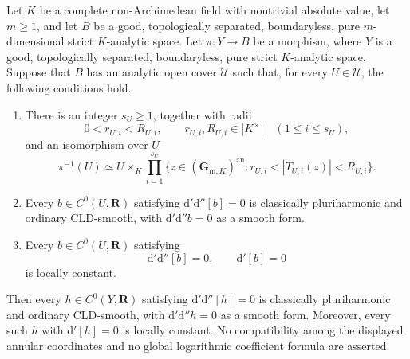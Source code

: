 \begin{proposition}
\label{prop:p062-stage-local-polyannulus-smooth-rigidity-transfer}
Let $K$ be a complete non-Archimedean field with nontrivial absolute value,
let $m\geq1$, and let $B$ be a good, topologically separated,
boundaryless, pure $m$-dimensional strict $K$-analytic space.  Let
$\pi:Y\to B$ be a morphism, where $Y$ is a good, topologically separated,
boundaryless, pure strict $K$-analytic space.  Suppose that $B$ has an
analytic open cover $\mathcal U$ such that, for every $U\in\mathcal U$,
the following conditions hold.
\begin{enumerate}
\item There is an integer $s_U\geq1$, together with radii
\[
 0<r_{U,i}<R_{U,i},\qquad r_{U,i},R_{U,i}\in|K^\times|
 \quad(1\leq i\leq s_U),
\]
and an isomorphism over $U$
\[
 \pi^{-1}(U)\simeq
 U\times_K\prod_{i=1}^{s_U}
 \{z\in(\mathbf G_{\mathrm m,K})^{\mathrm{an}}:
                  r_{U,i}<|T_{U,i}(z)|<R_{U,i}\}.
\]
\item Every $b\in C^0(U,\mathbf R)$ satisfying
$\mathrm d'\mathrm d''[b]=0$ is classically pluriharmonic and ordinary
CLD-smooth, with $\mathrm d'\mathrm d''b=0$ as a smooth form.
\item Every $b\in C^0(U,\mathbf R)$ satisfying
\[
             \mathrm d'\mathrm d''[b]=0,
             \qquad \mathrm d'[b]=0
\]
is locally constant.
\end{enumerate}
Then every $h\in C^0(Y,\mathbf R)$ satisfying
$\mathrm d'\mathrm d''[h]=0$ is classically pluriharmonic and ordinary
CLD-smooth, with $\mathrm d'\mathrm d''h=0$ as a smooth form.  Moreover,
every such $h$ with $\mathrm d'[h]=0$ is locally constant.  No compatibility
among the displayed annular coordinates and no global logarithmic
coefficient formula are asserted.
\end{proposition}

